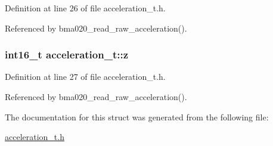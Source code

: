 Definition at line 26 of file acceleration\-\_\-t.\-h.



Referenced by bma020\-\_\-read\-\_\-raw\-\_\-acceleration().

\hypertarget{structacceleration__t_abd26d67856d2486cf776b4b408ccfc84}{
\subsubsection[{z}]{\setlength{\rightskip}{0pt plus 5cm}int16\-\_\-t acceleration\-\_\-t\-::z}}\label{structacceleration__t_abd26d67856d2486cf776b4b408ccfc84}


Definition at line 27 of file acceleration\-\_\-t.\-h.



Referenced by bma020\-\_\-read\-\_\-raw\-\_\-acceleration().



The documentation for this struct was generated from the following file\-:\begin{DoxyCompactItemize}
\item 
\hyperlink{acceleration__t_8h}{acceleration\-\_\-t.\-h}\end{DoxyCompactItemize}
